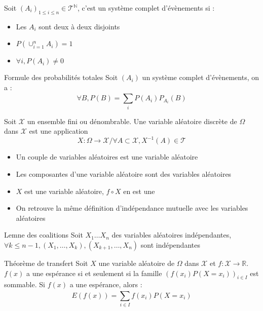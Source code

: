 \documentclass[french, a4paper, 10pt, twocolumn]{article}
\newcommand{\N}{\mathbb{N}}   %
\newcommand{\R}{\mathbb{R}}   %
\begin{document}
\begin{definition}
    Soit \((A_i)_{1 \leq i \leq n} \in \mathcal{T}^{\N}\), c'est un système complet d'évènements si :
    \begin{itemize}
        \item Les \(A_i\) sont deux à deux disjoints
        \item \(P(\cup_{i=1}^{n}A_i)=1\)
        \item \(\forall i, P(A_i)\neq 0\)
    \end{itemize}
\end{definition}

\begin{theoreme}{Formule des probabilités totales}
    Soit $(A_i)$ un système complet d'évènements, on a :
        \[\forall B, P(B)=\sum_{i}^{}P(A_i)P_{A_i}(B)\]
\end{theoreme}

\begin{definition}
    Soit \(\mathcal{X}\) un ensemble fini ou dénombrable.
    Une variable aléatoire discrète de \(\Omega\) dans \(\mathcal{X}\) est une application
        \[X : \Omega \rightarrow \mathcal{X} / \forall A \subset \mathcal{X}, X^{-1}(A) \in \mathcal{T}\]
    
    \tcblower
    \begin{itemize}
        \item Un couple de variables aléatoires est une variable aléatoire
        \item Les composantes d'une variable aléatoire sont des variables aléatoires
        \item \(X\) est une variable aléatoire, \(f\circ X\) en est une
        \item On retrouve la même définition d'indépendance mutuelle avec les variables aléatoires
    \end{itemize}
\end{definition}

\begin{theoreme}{Lemne des coalitions}
    Soit \(X_1\dots X_n\) des variables aléatoires indépendantes,
    \(\forall k \leq n-1, (X_1,\dots,X_k),(X_{k+1},\dots,X_n)\) sont indépendantes
\end{theoreme}

\begin{theoreme}{Théorème de transfert}
    Soit \(X\) une variable aléatoire de \(\Omega\) dans \(\mathcal{X}\) et \(f : \mathcal{X} \rightarrow \R\).
    \(f(x)\) a une espérance si et seulement si la famille \((f(x_i)P(X=x_i))_{i\in I}\) est sommable.
    Si \(f(x)\) a une espérance, alors : 
        \[E(f(x))=\sum_{i\in I}^{}f(x_i)P(X=x_i)\]
\end{theoreme}
\end{document}
